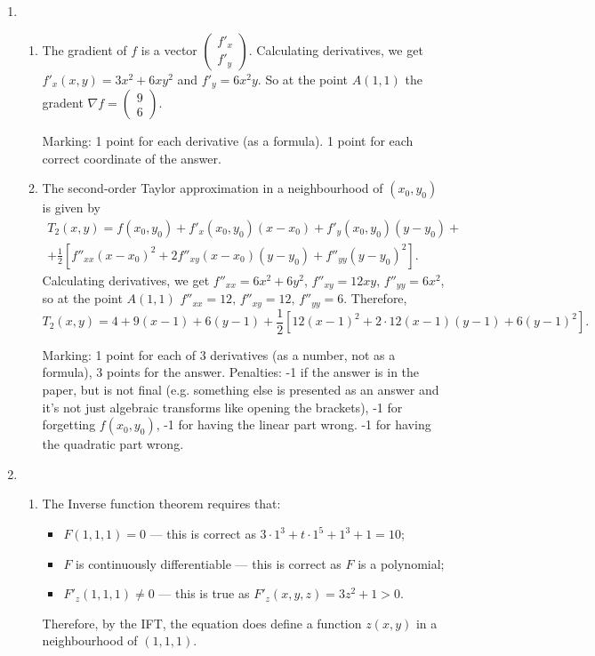 \begin{enumerate}
    \item
    \begin{enumerate}
        \item The gradient of $f$ is a vector $\begin{pmatrix}f'_x\\f'_y\end{pmatrix}$. Calculating derivatives, 
        we get $f'_x(x,y)=3x^2+6xy^2$ and $f'_y=6x^2y$. 
        So at the point $A(1,1)$ the gradent $\nabla f=\begin{pmatrix}9\\6\end{pmatrix}$.
        
        Marking: 1 point for each derivative (as a formula). 1 point for each correct coordinate of the answer.
        
        \item The second-order Taylor approximation in a neighbourhood of $(x_0,y_0)$ 
        is given by 
        \begin{multline*}
            T_2(x,y)=f(x_0,y_0)+f'_x(x_0,y_0)(x-x_0)+f'_y(x_0,y_0)(y-y_0)+\\
            +\frac12[f''_{xx}(x-x_0)^2+2f''_{xy}(x-x_0)(y-y_0)+f''_{yy}(y-y_0)^2].
        \end{multline*}
        Calculating derivatives, we get $f''_{xx}=6x^2+6y^2$, $f''_{xy}=12xy$, $f''_{yy}=6x^2$, 
        so at the point $A(1,1)$ $f''_{xx}=12,\,f''_{xy}=12,\,f''_{yy}=6$. Therefore,
        \[
        T_2(x,y)=4+9(x-1)+6(y-1)+\frac12[12(x-1)^2+2\cdot12(x-1)(y-1)+6(y-1)^2].
        \]
        
        Marking: 1 point for each of 3 derivatives (as a number, not as a formula), 3 points for the answer. 
        Penalties: -1 if the answer is in the paper, but is not final 
        (e.g. something else is presented as an answer and it's not just algebraic transforms like opening the brackets),
        -1 for forgetting $f(x_0,y_0)$, -1 for having the linear part wrong. -1 for having the quadratic part wrong.
    \end{enumerate}
    \item
    \begin{enumerate}
        \item The Inverse function theorem requires that:
        \begin{itemize}
            \item $F(1,1,1)=0$ — this is correct as $3\cdot1^3+t\cdot1^5+1^3+1=10$;
            \item $F$ is continuously differentiable — this is correct as $F$ is a polynomial;
            \item $F'_z(1,1,1)\neq 0$ — this is true as $F'_z(x,y,z)=3z^2+1>0$.
        \end{itemize}
        Therefore, by the IFT, the equation does define a function $z(x,y)$ in a neighbourhood of $(1,1,1)$.
        

\end{enumerate}
\end{enumerate}
